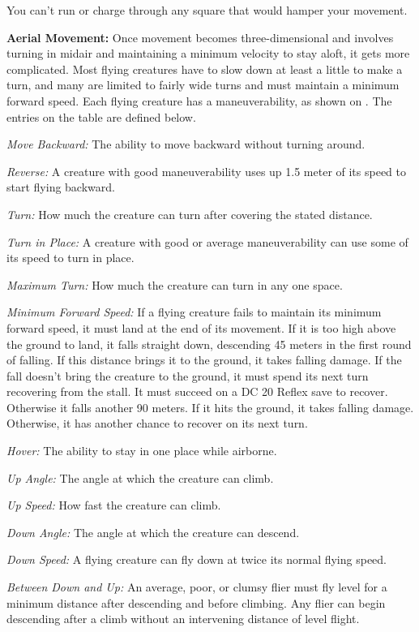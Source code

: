 You can't run or charge through any square that would hamper your movement.

\textbf{Aerial Movement:} Once movement becomes three-dimensional and involves turning in midair and maintaining a minimum velocity to stay aloft, it gets more complicated. Most flying creatures have to slow down at least a little to make a turn, and many are limited to fairly wide turns and must maintain a minimum forward speed. Each flying creature has a maneuverability, as shown on . The entries on the table are defined below.

\textit{Move Backward:} The ability to move backward without turning around.

\textit{Reverse:} A creature with good maneuverability uses up 1.5 meter of its speed to start flying backward.

\textit{Turn:} How much the creature can turn after covering the stated distance.

\textit{Turn in Place:} A creature with good or average maneuverability can use some of its speed to turn in place.

\textit{Maximum Turn:} How much the creature can turn in any one space.

\textit{Minimum Forward Speed:} If a flying creature fails to maintain its minimum forward speed, it must land at the end of its movement. If it is too high above the ground to land, it falls straight down, descending 45 meters in the first round of falling. If this distance brings it to the ground, it takes falling damage. If the fall doesn't bring the creature to the ground, it must spend its next turn recovering from the stall. It must succeed on a DC 20 Reflex save to recover. Otherwise it falls another 90 meters. If it hits the ground, it takes falling damage. Otherwise, it has another chance to recover on its next turn.

\textit{Hover:} The ability to stay in one place while airborne.

\textit{Up Angle:} The angle at which the creature can climb.

\textit{Up Speed:} How fast the creature can climb.

\textit{Down Angle:} The angle at which the creature can descend.

\textit{Down Speed:} A flying creature can fly down at twice its normal flying speed.

\textit{Between Down and Up:} An average, poor, or clumsy flier must fly level for a minimum distance after descending and before climbing. Any flier can begin descending after a climb without an intervening distance of level flight.


